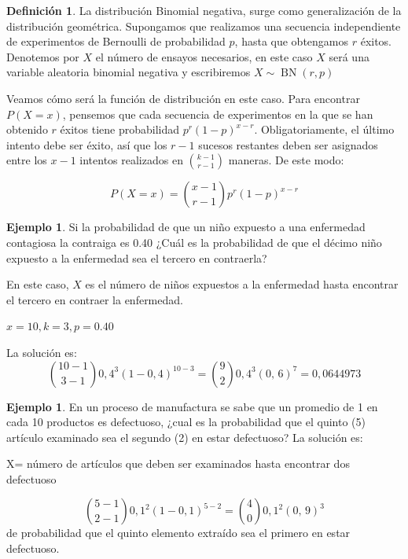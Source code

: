 \documentclass[]{book}
\theoremstyle{plain}
\theoremstyle{definition}
\newtheorem{definition}[theorem]{Definición}
\newtheorem{example}[theorem]{Ejemplo}
\theoremstyle{definition} %
\begin{document}
\begin{definition}
La distribución Binomial negativa, surge como generalización de la
distribución geométrica. Supongamos que realizamos una secuencia
independiente de experimentos de Bernoulli de probabilidad \(p\), hasta
que obtengamos \(r\) éxitos. Denotemos por \(X\) el número de ensayos
necesarios, en este caso \(X\) será una variable aleatoria binomial
negativa y escribiremos \(\displaystyle X\sim \operatorname {BN} (r,p)\)

Veamos cómo será la función de distribución en este caso. Para encontrar
\(P(X=x)\), pensemos que cada secuencia de experimentos en la que se han
obtenido \(r\) éxitos tiene probabilidad \(p^r(1-p)^{x-r}\).
Obligatoriamente, el último intento debe ser éxito, así que los \(r-1\)
sucesos restantes deben ser asignados entre los \(x-1\) intentos
realizados en \({k-1 \choose r-1}\) maneras. De este modo:

\[P(X=x) = {x-1 \choose r-1} p^r (1-p)^{x-r}\]
\end{definition}



\begin{example}

Si la probabilidad de que un niño expuesto a una enfermedad contagiosa
la contraiga es 0.40 ¿Cuál es la probabilidad de que el décimo niño
expuesto a la enfermedad sea el tercero en contraerla?

En este caso, \(X\) es el número de niños expuestos a la enfermedad
hasta encontrar el tercero en contraer la enfermedad.

\(\displaystyle \!x=10,k=3,p=0.40\)

La solución es:
\[\displaystyle {10-1 \choose 3-1}0,\!4^{3}(1-0,4)^{10-3}={9 \choose 2}0,\!4^{3}(0,\,6)^{7}=0,\!0644973\]
\end{example}

\begin{example}

En un proceso de manufactura se sabe que un promedio de 1 en cada 10
productos es defectuoso, ¿cual es la probabilidad que el quinto (5)
artículo examinado sea el segundo (2) en estar defectuoso? La solución
es:

X= número de artículos que deben ser examinados hasta encontrar dos
defectuoso

\[\displaystyle {5-1 \choose 2-1}0,\!1^{2}(1-0,\!1)^{5-2}={4 \choose 0}0,\!1^{2}(0,\,9)^{3}\]
de probabilidad que el quinto elemento extraído sea el primero en estar
defectuoso.
\end{example}
\end{document}
